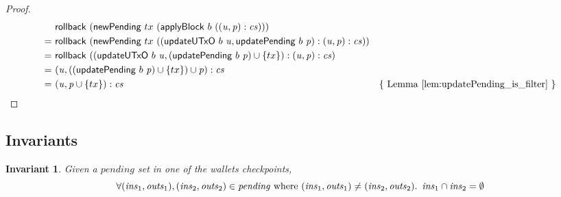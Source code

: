 \documentclass{article}
\newtheorem{invariant}[lemma]{Invariant}
\numberwithin{equation}{lemma}
\begin{document}
\begin{proof}
\begin{align*}
    & \mathsf{rollback} ~ (\mathsf{newPending} ~ tx ~ (\mathsf{applyBlock} ~ b ~ ((\mathit{u}, \mathit{p}) : \mathit{cs}))) \\
= ~ & \mathsf{rollback} ~ (\mathsf{newPending} ~ tx ~ (( \mathsf{updateUTxO} ~ b ~ \mathit{u}
         , \mathsf{updatePending} ~ b ~ \mathit{p}
         )
         : (\mathit{u}, \mathit{p}) : \mathit{cs}
         )) \\
= ~ & \mathsf{rollback} ~ (( \mathsf{updateUTxO} ~ b ~ \mathit{u}
         , (\mathsf{updatePending} ~ b ~ \mathit{p}) \cup \{tx\}
         )
         : (\mathit{u}, \mathit{p}) : \mathit{cs}
         ) \\
= ~ & (\mathit{u}, ((\mathsf{updatePending} ~ b ~ \mathit{p}) \cup \{tx\}) \cup \mathit{p}) : \mathit{cs} \\
= ~ & (\mathit{u}, \mathit{p} \cup \{tx\}) : \mathit{cs} & \text{\{ Lemma~\ref{lem:updatePending_is_filter} \}}
\end{align*}
\end{proof}

\subsection{Invariants}

\begin{invariant}
Given a $\mathit{pending}$ set in one of the wallets checkpoints,
\begin{equation*}
\forall (\mathit{ins}_1, \mathit{outs}_1), (\mathit{ins}_2, \mathit{outs}_2) \in \mathit{pending} \text{ where } (\mathit{ins}_1, \mathit{outs}_1) \ne (\mathit{ins}_2, \mathit{outs}_2) \ldotp ~
\mathit{ins}_1 \cap \mathit{ins}_2 = \emptyset
\end{equation*}
\end{invariant}
\end{document}
